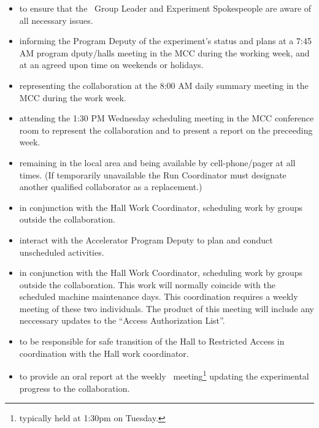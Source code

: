 \documentclass[10pt]{article}
\begin{document}
\begin{itemize}

\item to ensure that the \HALL\ Group Leader and Experiment
Spokespeople are  aware of all necessary issues.


\item informing the Program Deputy of the experiment's status and plans at 
a 7:45 AM program dputy/halls meeting in the MCC during the working week, and at an agreed
upon time on weekends or holidays.

\item representing the collaboration at the 8:00 AM daily summary meeting in the MCC
during the work week. 

\item attending the 1:30 PM Wednesday scheduling meeting in the MCC conference 
room to represent the collaboration and to present a report on the
preceeding week.

\item remaining in the local area and being available by cell-phone/pager 
at all times.  (If temporarily unavailable the Run Coordinator must designate another 
qualified collaborator as a replacement.)

\item in conjunction with the Hall Work Coordinator, scheduling work by groups
outside the collaboration. 

\item interact with the Accelerator Program Deputy to plan and conduct
unscheduled activities.


\item in conjunction with the Hall Work Coordinator, scheduling
work by groups outside the collaboration. This work will
normally coincide with the scheduled  machine maintenance days.
This coordination requires a weekly meeting of these  two
individuals. The product of this meeting will include any neccessary
updates to the ``Access  Authorization List''.

\item to be responsible for safe transition of the Hall to
Restricted Access in coordination with the Hall work
coordinator.

\item to provide an oral report at the weekly \HALL\
meeting\footnote{typically held at 1:30pm on Tuesday.} updating the
experimental progress to the collaboration.


\end{itemize}
\end{document}
